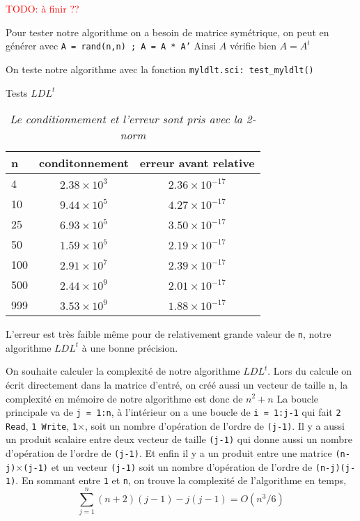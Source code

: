 \documentclass{article}
\begin{document}
\textcolor{red}{TODO: à finir ??}

Pour tester notre algorithme on a besoin de matrice symétrique, on peut en générer avec
\texttt{A = rand(n,n) ; A = A * A'}
Ainsi \(A\) vérifie bien \(A = A^t\)
\newline\indent

On teste notre algorithme avec la fonction \texttt{myldlt.sci: test\_myldlt()}

\begin{table}[H]
\caption{Tests \(LDL^t\)} \label{tab:title} 
\begin{center}
\begin{tabular}{|l|c|c|}
  \hline
  n & conditonnement & erreur avant relative \\
  \hline
	4	& \(2.38 \times 10^3\)	& \(2.36 \times 10^{-17}\) \\
	10	& \(9.44 \times 10^5\)	& \(4.27 \times 10^{-17}\) \\
	25	& \(6.93 \times 10^5\)	& \(3.50 \times 10^{-17}\) \\
	50	& \(1.59 \times 10^5\)	& \(2.19 \times 10^{-17}\) \\
	100	& \(2.91 \times 10^7\)	& \(2.39 \times 10^{-17}\) \\
	500	& \(2.44 \times 10^9\)	& \(2.01 \times 10^{-17}\) \\
	999	& \(3.53 \times 10^9\)	& \(1.88 \times 10^{-17}\) \\
  \hline
\end{tabular}
\end{center}
\caption*{\textit{Le conditionnement et l'erreur sont pris avec la 2-norm}}
\end{table}


L'erreur est très faible même pour de relativement grande valeur de \texttt{n}, notre algorithme \(LDL^t\) à une bonne précision.\newline\indent

On souhaite calculer la complexité de notre algorithme \(LDL^t\).\newline
Lors du calcule on écrit directement dans la matrice d'entré, on créé aussi un vecteur de taille n, la complexité en mémoire de notre algorithme est donc de \(n^2+n\)\newline
La boucle principale va de \texttt{j = 1:n}, à l'intérieur on a une boucle de \texttt{i = 1:j-1} qui fait \texttt{2 Read}, \texttt{1 Write}, \texttt{1}\(\times\), soit un nombre d'opération de l'ordre de \texttt{(j-1)}.\newline
Il y a aussi un produit scalaire entre deux vecteur de taille \texttt{(j-1)} qui donne aussi un nombre d'opération de l'ordre de \texttt{(j-1)}. \newline
Et enfin il y a un produit entre une matrice \texttt{(n-j)}\(\times\)\texttt{(j-1)} et un vecteur \texttt{(j-1)} soit un nombre d'opération de l'ordre de \texttt{(n-j)(j-1)}.\newline
En sommant entre \texttt{1} et \texttt{n}, on trouve la complexité de l'algorithme en temps,
\[
\sum_{j=1}^n (n+2)(j-1) - j(j-1) = O(n^3/6)
\]
\end{document}
